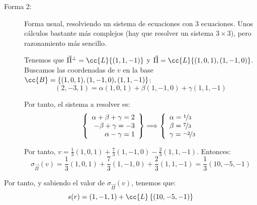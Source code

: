 \begin{ejercicio}
\begin{description}
        \item[Forma 2:] Forma usual, resolviendo un sistema de ecuaciones con 3 ecuaciones. Unos cálculos bastante más complejos (hay que resolver un sistema $3\times 3$), pero razonamiento más sencillo.

        Tenemos que $\vec{\Pi}^\perp = \cc{L}\{(1,1,-1)\}$ y $\vec{\Pi} = \cc{L}\{(1,0,1), (1,-1,0)\}$. Buscamos las coordenadas de $v$ en la base $\cc{B} = \{(1,0,1), (1,-1,0), (1,1,-1)\}$:
        \begin{equation*}
            (2,-3,1) = \alpha (1,0,1) + \beta(1,-1,0) + \gamma(1,1,-1)
        \end{equation*}

        Por tanto, el sistema a resolver es:
        \begin{equation*}
            \left\{\begin{array}{r}
                \alpha+\beta+\gamma = 2\\
                -\beta+\gamma = -3\\
                \alpha - \gamma = 1
            \end{array}\right\} \Longrightarrow \left\{\begin{array}{l}
                \alpha = \nicefrac{1}{3} \\
                \beta = \nicefrac{7}{3} \\
                \gamma = \nicefrac{-2}{3}
            \end{array}\right.
        \end{equation*}

        Por tanto, $v=\frac{1}{3}(1,0,1) +\frac{7}{3} (1,-1,0) -\frac{2}{3}(1,1,-1)$. Entonces:
        \begin{equation*}
            \sigma_{\vec{\Pi}}(v) = \frac{1}{3}(1,0,1) +\frac{7}{3} (1,-1,0) +\frac{2}{3}(1,1,-1) = \frac{1}{3}(10, -5, -1)
        \end{equation*}
    \end{description}

    Por tanto, y sabiendo el valor de $\sigma_{\vec{\Pi}}(v)$, tenemos que:
    \begin{equation*}
        s(r) = (1,-1,1) + \cc{L}\left\{(10,-5,-1)\right\}
    \end{equation*}
    
    
    
\end{ejercicio}

